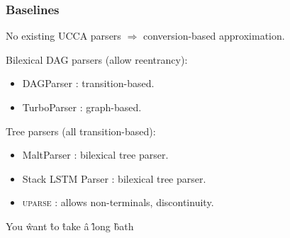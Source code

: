\documentclass[t]{beamer}
\begin{document}
\begin{frame}
\frametitle{Baselines}
No existing UCCA parsers $\Rightarrow$ conversion-based approximation.

Bilexical DAG parsers (allow {\color{orange}reentrancy}):
\begin{itemize}
 \item DAGParser \cite{ribeyre-villemontedelaclergerie-seddah:2014:SemEval}:
 transition-based.
 \item TurboParser \cite{almeida-martins:2015:SemEval}:
 graph-based.
\end{itemize}

Tree parsers (all transition-based):
\begin{itemize}
 \item MaltParser \cite{nivre2007maltparser}: bilexical tree parser.
 \item Stack LSTM Parser \cite{dyer2015transition}: bilexical tree parser.
 \item \textsc{uparse} \cite{maier2015discontinuous}: allows {\color{blue}non-terminals}, {\color{red}discontinuity}.
\end{itemize}

\begin{center}
	\begin{dependency}
	\begin{deptext}[column sep=1.5em,ampersand replacement=\^,font=\rmfamily]
	You \^ want \^ to \^ take \^ a \^ long \^ bath \\
	\end{deptext}
	\end{dependency}
\end{center}
\end{frame}
\end{document}
